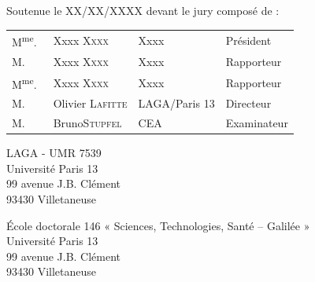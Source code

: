 \begin{titlepage}
\begin{center}

{\Large Soutenue le XX/XX/XXXX devant le jury composé de :}

{\Large
\begin{tabular}{l@{\hskip 0cm}lll}
M\textsuperscript{me}.~&Xxxx \textsc{Xxxx} & Xxxx & Président\\
M.&Xxxx \textsc{Xxxx} & Xxxx & Rapporteur\\
M\textsuperscript{me}.&Xxxx \textsc{Xxxx} & Xxxx & Rapporteur\\
M.&Olivier \textsc{Lafitte} & LAGA/Paris 13 & Directeur\\
M.~&Bruno\textsc{Stupfel} & CEA & Examinateur\\
\end{tabular}
}

\end{center}

\newpage
\thispagestyle{empty}
\vspace*{\fill}

\noindent
\begin{center}
\begin{minipage}[t]{0.5\textwidth}
LAGA - UMR 7539\\
Université Paris 13\\
99 avenue J.B. Clément\\
93430 Villetaneuse
\end{minipage}%
%
\hfill%
%
\begin{minipage}[t]{0.5\textwidth}
École doctorale 146 « Sciences, Technologies, Santé – Galilée »\\
Université Paris 13\\
99 avenue J.B. Clément\\
93430 Villetaneuse
\end{minipage}
\end{center}



\end{titlepage}
\hypersetup{pageanchor=true}
\cleardoublepage